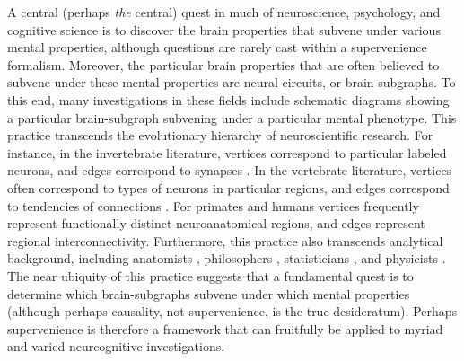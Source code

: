 \documentclass{article}
\begin{document}

A central (perhaps \emph{the} central) quest in much of neuroscience, psychology, and cognitive science is to discover the brain properties that subvene under various mental properties, although questions are rarely cast within a  supervenience formalism.  Moreover, the particular brain properties that are often believed to subvene under these mental properties are neural circuits, or brain-subgraphs.  To this end, many investigations in these fields include schematic diagrams showing a particular brain-subgraph subvening under a particular mental phenotype. This practice transcends the evolutionary hierarchy of neuroscientific research.  For instance, in the invertebrate literature, vertices correspond to particular labeled neurons, and edges correspond to synapses \cite{NorthGreenspan07}.  In the vertebrate literature, vertices often correspond to types of neurons in particular regions, and edges correspond to tendencies of connections \cite{Shepherd04}.  For primates \cite{Felleman_VanEssen91} and humans \cite{Mori05} vertices frequently represent functionally distinct neuroanatomical regions, and edges represent regional interconnectivity. Furthermore, this practice also transcends analytical background, including anatomists \cite{Abeles91}, philosophers \cite{Koch_Davis94}, statisticians \cite{Rao_Lewicki02}, and physicists \cite{Chow_Dalibard03}.  The near ubiquity of this practice suggests that a fundamental quest is to determine which brain-subgraphs subvene under which mental properties (although perhaps causality, not supervenience, is the true desideratum).  Perhaps supervenience is therefore a framework that can fruitfully be applied to myriad and varied neurcognitive investigations.



\end{document}
